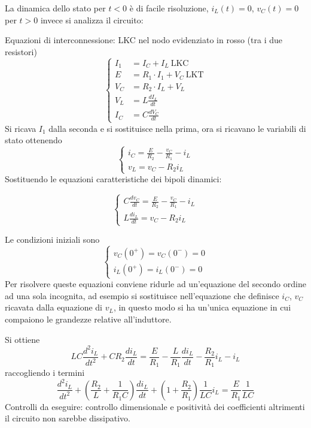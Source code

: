 La dinamica dello stato per $t<0$ è di facile risoluzione, $i_L(t) = 0$, $v_C(t) = 0$
per $t > 0$ invece si analizza il circuito:

Equazioni di interconnessione: 
LKC nel nodo evidenziato in rosso (tra i due resistori)
\begin{equation*}
\begin{cases}
I_1 &= I_C+I_L \ \text{LKC}\\
E &= R_1\cdot I_1 + V_C\ \text{LKT} \\
V_C &= R_2 \cdot I_L + V_L \\
V_L &= L\frac{dI_L}{dt} \\
I_C &= C\frac{dV_C}{dt}
\end{cases}
\end{equation*}
Si ricava $I_1$ dalla seconda e si sostituisce nella prima,
ora si ricavano le variabili di stato ottenendo
$$
\begin{cases}
i_C = \frac{E}{R_2} - \frac{v_C}{R_1} - i_L \\
v_L = v_C - R_2 i_L
\end{cases}
$$
Sostituendo le equazioni caratteristiche dei bipoli dinamici:

$$
\begin{cases}
C\frac{dv_C}{dt} = \frac{E}{R_2} - \frac{v_C}{R_1} - i_L \\
L\frac{di_L}{dt} = v_C - R_2 i_L
\end{cases}
$$

Le condizioni iniziali sono 
$$\begin{cases}
v_C(0^+) = v_C(0^-) = 0\\
i_L(0^+) = i_L(0^-) = 0
\end{cases}
$$
Per risolvere queste equazioni conviene ridurle ad un'equazione del secondo ordine ad una sola incognita,
ad esempio si sostituisce nell'equazione che definisce $i_C$, $v_C$ ricavata dalla equazione di
$v_L$, in questo modo si ha un'unica equazione in cui compaiono le grandezze relative all'induttore.

Si ottiene 
\begin{equation}
LC \frac{d^2i_L}{dt^2} + CR_2\frac{di_L}{dt} = \frac{E}{R_1} - \frac{L}{R_1}\frac{di_L}{dt} - \frac{R_2}{R_1}i_L-i_L
\end{equation}
raccogliendo i termini
$$
\frac{d^2i_L}{dt^2} + \left(\frac{R_2}{L} + \frac{1}{R_1C}\right)\frac{di_L}{dt}+ \left(1 + \frac{R_2}{R_1}\right)\frac{1}{LC} i_L = \frac{E}{R_1}\frac{1}{LC}
$$
Controlli da eseguire: controllo dimensionale e positività dei coefficienti altrimenti il circuito non sarebbe dissipativo.

